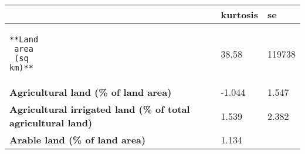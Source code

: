 \documentclass[
]{article}
\begin{document}
\begin{longtable}[]{@{}lll@{}}
\toprule
\begin{minipage}[b]{0.22\columnwidth}\raggedright
~\strut
\end{minipage} & \begin{minipage}[b]{0.14\columnwidth}\raggedright
kurtosis\strut
\end{minipage} & \begin{minipage}[b]{0.14\columnwidth}\raggedright
se\strut
\end{minipage}\tabularnewline
\midrule
\endhead
\begin{minipage}[t]{0.22\columnwidth}\raggedright
\begin{verbatim}
**Land
 area
 (sq
km)**
\end{verbatim}
\strut
\end{minipage} & \begin{minipage}[t]{0.14\columnwidth}\raggedright
38.58\strut
\end{minipage} & \begin{minipage}[t]{0.14\columnwidth}\raggedright
119738\strut
\end{minipage}\tabularnewline
\begin{minipage}[t]{0.22\columnwidth}\raggedright
\textbf{Agricultural land (\% of land area)}\strut
\end{minipage} & \begin{minipage}[t]{0.14\columnwidth}\raggedright
-1.044\strut
\end{minipage} & \begin{minipage}[t]{0.14\columnwidth}\raggedright
1.547\strut
\end{minipage}\tabularnewline
\begin{minipage}[t]{0.22\columnwidth}\raggedright
\textbf{Agricultural irrigated land (\% of total agricultural
land)}\strut
\end{minipage} & \begin{minipage}[t]{0.14\columnwidth}\raggedright
1.539\strut
\end{minipage} & \begin{minipage}[t]{0.14\columnwidth}\raggedright
2.382\strut
\end{minipage}\tabularnewline
\begin{minipage}[t]{0.22\columnwidth}\raggedright
\textbf{Arable land (\% of land area)}\strut
\end{minipage} & \begin{minipage}[t]{0.14\columnwidth}\raggedright
1.134\strut
\end{minipage} & \begin{minipage}[t]{0.14\columnwidth}\raggedright

\end{minipage}
\end{longtable}
\end{document}
